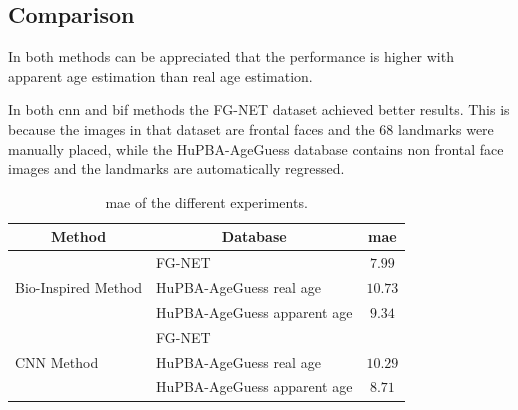 
\subsection{Comparison}


In both methods can be appreciated that the performance is higher with apparent age estimation than real age estimation. 

In both \gls{cnn} and \gls{bif} methods the FG-NET dataset achieved better results. This is because the images in that dataset are frontal faces and the 68 landmarks were manually placed, while the HuPBA-AgeGuess database contains non frontal face images and the landmarks are automatically regressed.

\begin{table}[!h]
	\centering
	\begin{tabular}{|l|l|c|}
		\hline
		\multicolumn{1}{|c|}{\textbf{Method}} & 
		\multicolumn{1}{|c|}{\textbf{Database}} & \textbf{\gls{mae}}\\ \hline\hline%
		\multirow{3}{*}{Bio-Inspired Method} & FG-NET & $7.99$\\ 		\cline{2-3} 
		& HuPBA-AgeGuess real age & $10.73$\\ \cline{2-3}
		& HuPBA-AgeGuess apparent age & $9.34$\\ \hline\hline%
		\multirow{3}{*}{CNN Method} & FG-NET & \\ \cline{2-3}
		& HuPBA-AgeGuess real age & $10.29$\\ \cline{2-3}
		
		& HuPBA-AgeGuess apparent age & $8.71$ \\ \hline
		
		
	\end{tabular}
	\caption{\gls{mae} of the different experiments.}
	\label{tab:results}
\end{table}